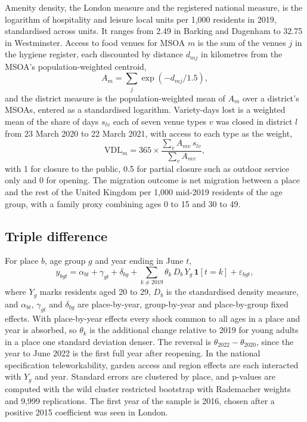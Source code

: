 \documentclass[11pt,a4paper]{article}
\begin{document}
Amenity density, the London measure and the registered national measure, is the logarithm of hospitality and leisure local units per 1,000 residents in 2019, standardised across units. It ranges from 2.49 in Barking and Dagenham to 32.75 in Westminster. Access to food venues for MSOA $m$ is the sum of the venues $j$ in the hygiene register, each discounted by distance $d_{mj}$ in kilometres from the MSOA's population-weighted centroid,
\begin{equation}\label{eq:access}
A_m = \sum_j \exp(-d_{mj}/1.5),
\end{equation}
and the district measure is the population-weighted mean of $A_m$ over a district's MSOAs, entered as a standardised logarithm. Variety-days lost is a weighted mean of the share of days $s_{lv}$ each of seven venue types $v$ was closed in district $l$ from 23 March 2020 to 22 March 2021, with access to each type as the weight,
\begin{equation}\label{eq:vdl}
\mathrm{VDL}_m = 365 \times \frac{\sum_v A_{mv} \, s_{lv}}{\sum_v A_{mv}},
\end{equation}
with 1 for closure to the public, 0.5 for partial closure such as outdoor service only and 0 for opening. The migration outcome is net migration between a place and the rest of the United Kingdom per 1,000 mid-2019 residents of the age group, with a family proxy combining ages 0 to 15 and 30 to 49.

\subsection{Triple difference}

For place $b$, age group $g$ and year ending in June $t$,
\begin{equation}\label{eq:ddd}
y_{bgt} = \alpha_{bt} + \gamma_{gt} + \delta_{bg} + \sum_{k \neq 2019} \theta_k \, D_b \, Y_g \, \mathbf{1}[t = k] + \varepsilon_{bgt},
\end{equation}
where $Y_g$ marks residents aged 20 to 29, $D_b$ is the standardised density measure, and $\alpha_{bt}$, $\gamma_{gt}$ and $\delta_{bg}$ are place-by-year, group-by-year and place-by-group fixed effects. With place-by-year effects every shock common to all ages in a place and year is absorbed, so $\theta_k$ is the additional change relative to 2019 for young adults in a place one standard deviation denser. The reversal is $\theta_{2022} - \theta_{2020}$, since the year to June 2022 is the first full year after reopening. In the national specification teleworkability, garden access and region effects are each interacted with $Y_g$ and year. Standard errors are clustered by place, and p-values are computed with the wild cluster restricted bootstrap with Rademacher weights and 9,999 replications. The first year of the sample is 2016, chosen after a positive 2015 coefficient was seen in London.
\end{document}
